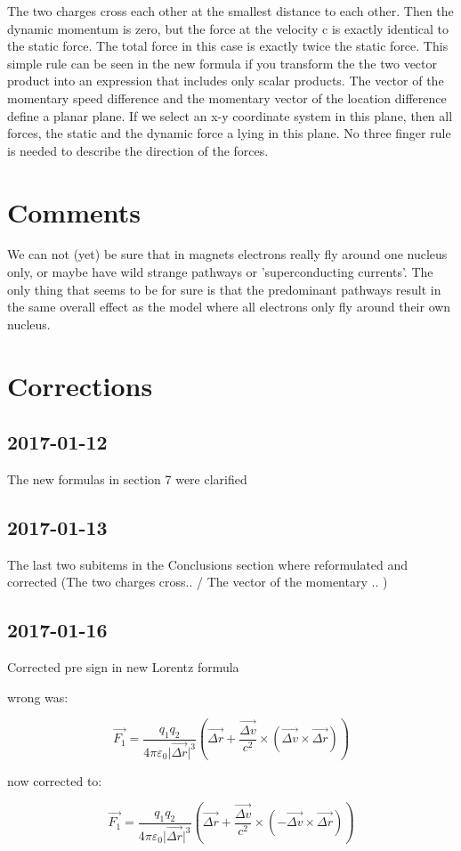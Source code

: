 \documentclass[12pt,a4paper,twocolumn]{article}
\begin{document}
\begin{itemize}
  \subitem The two charges cross each other at the smallest distance to each other. Then the dynamic momentum is zero, but the force at the velocity c is exactly identical to the static force. The total force in this case is exactly twice the static force. This simple rule can be seen in the new formula if you transform the the two vector product into an expression that includes only scalar products.
  \subitem The vector of the momentary speed difference and the momentary vector of the location difference define a planar plane. If we select an x-y coordinate system in this plane, then all forces, the static and the dynamic force a lying in this plane. No three finger rule is needed to describe the direction of the forces.
\end{itemize}

\section{Comments}
We can not (yet) be sure that in magnets electrons really fly around one nucleus only, or maybe have wild strange pathways or 'superconducting currents'. The only thing that seems to be for sure is that the predominant pathways result in the same overall effect as the model where all electrons only fly around their own nucleus.

\section{Corrections}
\subsection{2017-01-12}
The new formulas in section 7 were clarified 
\subsection{2017-01-13}
The last two subitems in the Conclusions section where reformulated and corrected (The two charges cross.. / The vector of the momentary .. )
\subsection{2017-01-16}
Corrected pre sign in new Lorentz formula

wrong was: 

$$\vec{F_1}= \frac{q_1 q_2}{4\pi\varepsilon_0 \vert \vec{\Delta r} \vert^3} ( \vec{\Delta r} + \frac{\vec{\Delta v}}{c^2} \times (\vec{\Delta v} \times \vec{\Delta r}))$$

now corrected to: 

$$\vec{F_1}= \frac{q_1 q_2}{4\pi\varepsilon_0 \vert \vec{\Delta r} \vert^3} ( \vec{\Delta r} + \frac{\vec{\Delta v}}{c^2} \times (-\vec{\Delta v} \times \vec{\Delta r}))$$
\end{document}
